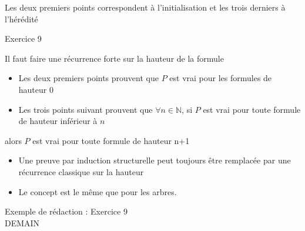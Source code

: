 \begin{rq}
    Les deux premiers points correspondent à l'initialisation et les trois derniers à l'hérédité
\end{rq}

\begin{ex}
    Exercice 9
\end{ex}

\begin{dem}
    Il faut faire une récurrence forte sur la hauteur de la formule
    \begin{itemize}
        \item Les deux premiers points prouvent que $P$ est vrai pour les formules de hauteur $0$
        \item Les trois points suivant prouvent que $\forall n \in \mathbb{N}$, si $P$ est vrai pour toute formule de hauteur inférieur à $n$
    \end{itemize}
    alors $P$ est vrai pour toute formule de hauteur n+1
\end{dem}

\begin{rq}
    \begin{itemize}
        \item Une preuve par induction structurelle peut toujours être remplacée par une récurrence classique sur la hauteur
        \item Le concept est le même que pour les arbres.
    \end{itemize}
\end{rq}

\begin{ex} Exemple de rédaction : Exercice 9 \\
    DEMAIN
\end{ex}





































    


























